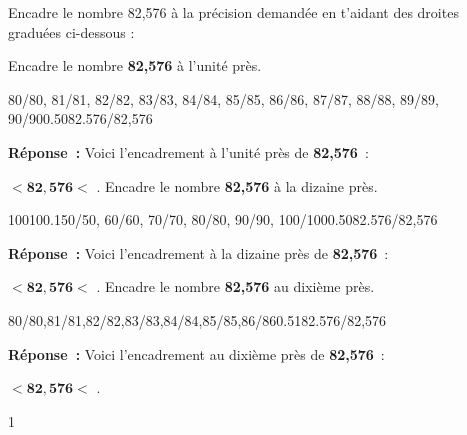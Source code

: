 \documentclass[a4paper,11pt]{report}
\begin{document}
\begin{exop}{
Encadre le nombre 82,576 à la précision demandée en t'aidant des droites graduées ci-dessous : 
\begin{tasks}
\task Encadre le nombre {\bf 82,576} à l'unité près.
\begin{center}
\begin{numberlined}{80}{90}{1}{0.1}{80/80, 81/81, 82/82, 83/83, 84/84, 85/85, 86/86, 87/87, 88/88, 89/89, 90/90}{0.5}{0}{82.576/{82,576}}\end{numberlined}
\end{center}
{\bf Réponse~:} Voici l'encadrement à l'unité près de {\bf 82,576}~: 

\makebox[.8in]{\hrulefill} $ < \bm{82,576} < $ \makebox[.8in]{\hrulefill} .
\task Encadre le nombre {\bf 82,576} à la dizaine près.
\begin{center}
\begin{numberlined}{50}{100}{10}{0.1}{50/50, 60/60, 70/70, 80/80, 90/90, 100/100}{0.5}{0}{82.576/{82,576}}\end{numberlined}
\end{center}
{\bf Réponse~:} Voici l'encadrement à la dizaine près de {\bf 82,576}~: 

\makebox[.8in]{\hrulefill} $  < \bm{82,576} <  $ \makebox[.8in]{\hrulefill} .
\task Encadre le nombre {\bf 82,576} au dixième près.
\begin{center}
\begin{numberlined}{80}{86}{1}{0.1}{80/80,81/81,82/82,83/83,84/84,85/85,86/86}{0.5}{1}{82.576/{82,576}}\end{numberlined}
\end{center}

{\bf Réponse~:} Voici l'encadrement au dixième près de {\bf 82,576}~: 

 \makebox[.8in]{\hrulefill} $ < \bm{82,576} < $  \makebox[.8in]{\hrulefill} .
\end{tasks}
}{1}
\end{exop}
\end{document}
